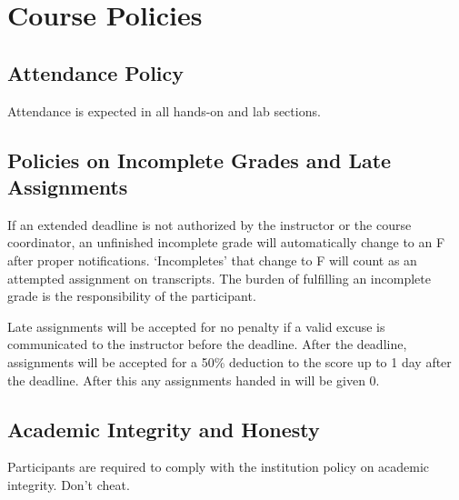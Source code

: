 \documentclass[11pt]{article}
\begin{document}

\section*{Course Policies}


\subsection*{Attendance Policy}
\footnotesize{Attendance is expected in all hands-on and lab sections.}%

\subsection*{Policies on Incomplete Grades and Late Assignments}
\footnotesize{If an extended deadline is not authorized by the instructor or the course coordinator, an unfinished incomplete grade will automatically change to an F after proper notifications. `Incompletes' that change to F will count as an attempted assignment on transcripts. The burden of fulfilling an incomplete grade is the responsibility of the participant.}

\footnotesize{Late assignments will be accepted for no penalty if a valid excuse is communicated to the instructor before the deadline. After the deadline, assignments will be accepted for a 50\% deduction to the score up to 1 day after the deadline. After this any assignments handed in will be given 0.}

\subsection*{Academic Integrity and Honesty}
\footnotesize{Participants are required to comply with the institution policy on academic integrity. Don't cheat.}





\end{document}
